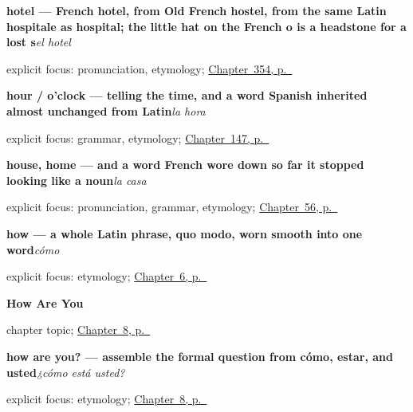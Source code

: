 \noindent\begin{minipage}[t]{\linewidth}
\raggedright
\textbf{hotel — French hotel, from Old French hostel, from the same Latin hospitale as hospital; the little hat on the French o is a headstone for a lost s}\enspace\emph{el hotel}\par
\footnotesize explicit focus: pronunciation, etymology; \hyperref[ch:el-hotel-y-el-cine]{Chapter~354, p.~\pageref*{ch:el-hotel-y-el-cine}}
\end{minipage}\par\smallskip

\noindent\begin{minipage}[t]{\linewidth}
\raggedright
\textbf{hour / o'clock — telling the time, and a word Spanish inherited almost unchanged from Latin}\enspace\emph{la hora}\par
\footnotesize explicit focus: grammar, etymology; \hyperref[ch:spanish-telling-time]{Chapter~147, p.~\pageref*{ch:spanish-telling-time}}
\end{minipage}\par\smallskip

\noindent\begin{minipage}[t]{\linewidth}
\raggedright
\textbf{house, home — and a word French wore down so far it stopped looking like a noun}\enspace\emph{la casa}\par
\footnotesize explicit focus: pronunciation, grammar, etymology; \hyperref[ch:noun-casa]{Chapter~56, p.~\pageref*{ch:noun-casa}}
\end{minipage}\par\smallskip

\noindent\begin{minipage}[t]{\linewidth}
\raggedright
\textbf{how — a whole Latin phrase, quo modo, worn smooth into one word}\enspace\emph{cómo}\par
\footnotesize explicit focus: etymology; \hyperref[ch:asking-a-name]{Chapter~6, p.~\pageref*{ch:asking-a-name}}
\end{minipage}\par\smallskip

\noindent\begin{minipage}[t]{\linewidth}
\raggedright
\textbf{How Are You}\par
\footnotesize chapter topic; \hyperref[ch:how-are-you]{Chapter~8, p.~\pageref*{ch:how-are-you}}
\end{minipage}\par\smallskip

\noindent\begin{minipage}[t]{\linewidth}
\raggedright
\textbf{how are you? — assemble the formal question from cómo, estar, and usted}\enspace\emph{¿cómo está usted?}\par
\footnotesize explicit focus: etymology; \hyperref[ch:how-are-you]{Chapter~8, p.~\pageref*{ch:how-are-you}}
\end{minipage}\par\smallskip

